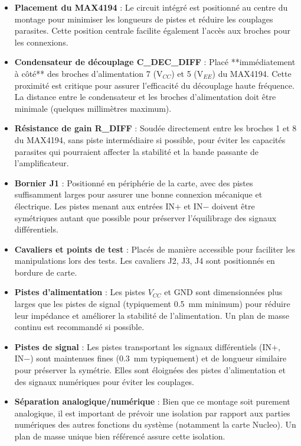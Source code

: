 \documentclass{article}
\begin{document}
\begin{itemize}
    \item \textbf{Placement du MAX4194} : Le circuit intégré est positionné au centre du montage pour minimiser les longueurs de pistes et réduire les couplages parasites. Cette position centrale facilite également l'accès aux broches pour les connexions.
    
    \item \textbf{Condensateur de découplage C\_DEC\_DIFF} : Placé **immédiatement à côté** des broches d'alimentation 7 (V$_{CC}$) et 5 (V$_{EE}$) du MAX4194. Cette proximité est critique pour assurer l'efficacité du découplage haute fréquence. La distance entre le condensateur et les broches d'alimentation doit être minimale (quelques millimètres maximum).
    
    \item \textbf{Résistance de gain R\_DIFF} : Soudée directement entre les broches 1 et 8 du MAX4194, sans piste intermédiaire si possible, pour éviter les capacités parasites qui pourraient affecter la stabilité et la bande passante de l'amplificateur.
    
    \item \textbf{Bornier J1} : Positionné en périphérie de la carte, avec des pistes suffisamment larges pour assurer une bonne connexion mécanique et électrique. Les pistes menant aux entrées IN+ et IN− doivent être symétriques autant que possible pour préserver l'équilibrage des signaux différentiels.
    
    \item \textbf{Cavaliers et points de test} : Placés de manière accessible pour faciliter les manipulations lors des tests. Les cavaliers J2, J3, J4 sont positionnés en bordure de carte.
    
    \item \textbf{Pistes d'alimentation} : Les pistes $V_{CC}$ et GND sont dimensionnées plus larges que les pistes de signal (typiquement 0.5~mm minimum) pour réduire leur impédance et améliorer la stabilité de l'alimentation. Un plan de masse continu est recommandé si possible.
    
    \item \textbf{Pistes de signal} : Les pistes transportant les signaux différentiels (IN+, IN−) sont maintenues fines (0.3~mm typiquement) et de longueur similaire pour préserver la symétrie. Elles sont éloignées des pistes d'alimentation et des signaux numériques pour éviter les couplages.
    
    \item \textbf{Séparation analogique/numérique} : Bien que ce montage soit purement analogique, il est important de prévoir une isolation par rapport aux parties numériques des autres fonctions du système (notamment la carte Nucleo). Un plan de masse unique bien référencé assure cette isolation.
\end{itemize}
\end{document}
